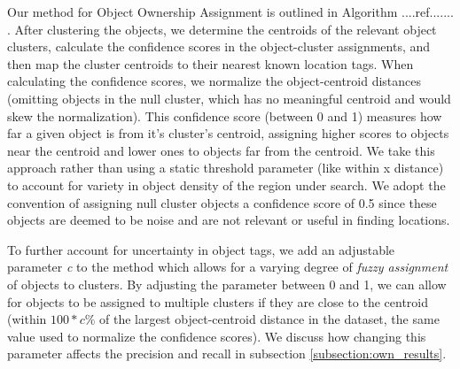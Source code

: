 Our method for Object Ownership Assignment is outlined in Algorithm ....ref....... . 
After clustering the objects, we determine the centroids of the relevant object clusters, calculate the confidence scores in the object-cluster assignments, and then map the cluster centroids to their nearest known location tags. 
When calculating the confidence scores, we normalize the object-centroid distances (omitting objects in the null cluster, which has no meaningful centroid and would skew the normalization). 
This confidence score (between 0 and 1) measures how far a given object is from it's cluster's centroid, assigning higher scores to objects near the centroid and lower ones to objects far from the centroid. 
We take this approach rather than using a static threshold parameter (like within x distance) to account for variety in object density of the region under search. 
We adopt the convention of assigning null cluster objects a confidence score of 0.5 since these objects are deemed to be noise and are not relevant or useful in finding locations.

To further account for uncertainty in object tags, we add an adjustable parameter \textit{c} to the method which allows for a varying degree of \textit{fuzzy assignment} of objects to clusters. 
By adjusting the parameter between 0 and 1, we can allow for objects to be assigned to multiple clusters if they are close to the centroid (within \textit{$100*c\%$} of the largest object-centroid distance in the dataset, the same value used to normalize the confidence scores). We discuss how changing this parameter affects the precision and recall in subsection \ref{subsection:own_results}.
 





